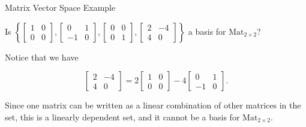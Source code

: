 \documentclass[xcolor=dvipsnames,aspectratio=169,t]{beamer}
\begin{document}
\begin{frame}{Matrix Vector Space Example}
  \bigskip

  Is \alert{$\left\{ \begin{bmatrix} 1 & 0 \\ 0 & 0 \end{bmatrix} , \begin{bmatrix} 0 & 1 \\ -1 & 0 \end{bmatrix} ,  \begin{bmatrix} 0 & 0 \\ 0 & 1 \end{bmatrix} ,  \begin{bmatrix} 2 & -4 \\ 4 & 0 \end{bmatrix} \right\}$} a basis for $\mbox{Mat}_{2 \times 2}$?
  \vspace{0.3in}

  \pause
  Notice that we have 

  \[  \begin{bmatrix} 2 & -4 \\ 4 & 0 \end{bmatrix} = 2  \begin{bmatrix} 1 & 0 \\ 0 & 0 \end{bmatrix} - 4 \begin{bmatrix} 0 & 1 \\ -1 & 0 \end{bmatrix} . \]
  \medskip

  Since one matrix can be written as a linear combination of other matrices in the set, this is a \alert{linearly dependent set}, and it cannot be a basis for $\mbox{Mat}_{2 \times 2}$.
\end{frame}
\end{document}
